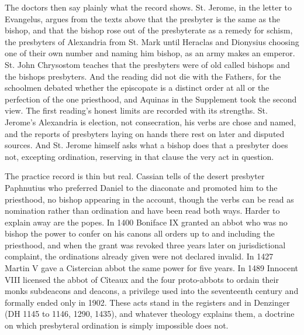 The doctors then say plainly what the record shows. St. Jerome, in the letter to Evangelus, argues from the texts above that the presbyter is the same as the bishop, and that the bishop rose out of the presbyterate as a remedy for schism, the presbyters of Alexandria from St. Mark until Heraclas and Dionysius choosing one of their own number and naming him bishop, as an army makes an emperor. St. John Chrysostom teaches that the presbyters were of old called bishops and the bishops presbyters. And the reading did not die with the Fathers, for the schoolmen debated whether the episcopate is a distinct order at all or the perfection of the one priesthood, and Aquinas in the Supplement took the second view. The first reading's honest limits are recorded with its strengths. St. Jerome's Alexandria is election, not consecration, his verbs are chose and named, and the reports of presbyters laying on hands there rest on later and disputed sources. And St. Jerome himself asks what a bishop does that a presbyter does not, excepting ordination, reserving in that clause the very act in question.

The practice record is thin but real. Cassian tells of the desert presbyter Paphnutius who preferred Daniel to the diaconate and promoted him to the priesthood, no bishop appearing in the account, though the verbs can be read as nomination rather than ordination and have been read both ways. Harder to explain away are the popes. In 1400 Boniface IX granted an abbot who was no bishop the power to confer on his canons all orders up to and including the priesthood, and when the grant was revoked three years later on jurisdictional complaint, the ordinations already given were not declared invalid. In 1427 Martin V gave a Cistercian abbot the same power for five years. In 1489 Innocent VIII licensed the abbot of C\^iteaux and the four proto-abbots to ordain their monks subdeacons and deacons, a privilege used into the seventeenth century and formally ended only in 1902. These acts stand in the registers and in Denzinger (DH 1145 to 1146, 1290, 1435), and whatever theology explains them, a doctrine on which presbyteral ordination is simply impossible does not.

